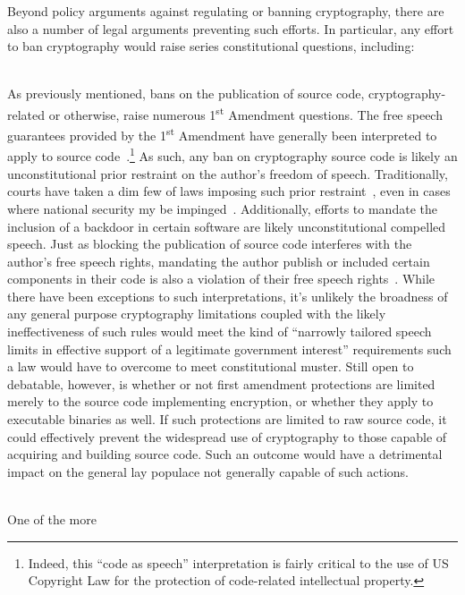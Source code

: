 Beyond policy arguments against regulating or banning cryptography, there
are also a number of legal arguments preventing such efforts. In
particular, any effort to ban cryptography would raise series
constitutional questions, including:

\begin{packed_desc}
\item[1\textsuperscript{st} Amendment] \hfill \\ As previously
  mentioned, bans on the publication of source code,
  cryptography-related or otherwise, raise numerous
  1\textsuperscript{st} Amendment questions. The free speech
  guarantees provided by the 1\textsuperscript{st} Amendment have
  generally been interpreted to apply to source
  code~\cite{ninthcir-bernstein, sixthcir-junger}.\footnote{Indeed,
    this ``code as speech'' interpretation is fairly critical to the
    use of US Copyright Law for the protection of code-related
    intellectual property.} As such, any ban on cryptography source
  code is likely an unconstitutional prior restraint on the author's
  freedom of speech. Traditionally, courts have taken a dim few of
  laws imposing such prior restraint~\cite{scotus-nearvminnesota},
  even in cases where national security my be
  impinged~\cite{scotus-nytvus}. Additionally, efforts to mandate the
  inclusion of a backdoor in certain software are likely
  unconstitutional compelled speech. Just as blocking the publication
  of source code interferes with the author's free speech rights,
  mandating the author publish or included certain components in their
  code is also a violation of their free speech
  rights~\cite{scotus-wooleyvmaynard}. While there have been
  exceptions to such interpretations, it's unlikely the broadness of
  any general purpose cryptography limitations coupled with the likely
  ineffectiveness of such rules would meet the kind of ``narrowly
  tailored speech limits in effective support of a legitimate
  government interest'' requirements such a law would have to overcome
  to meet constitutional muster. Still open to debatable, however, is
  whether or not first amendment protections are limited merely to the
  source code implementing encryption, or whether they apply to
  executable binaries as well. If such protections are limited to raw
  source code, it could effectively prevent the widespread use of
  cryptography to those capable of acquiring and building source
  code. Such an outcome would have a detrimental impact on the general
  lay populace not generally capable of such actions.
\item[2\textsuperscript{nd} Amendment] \hfill \\ One of the more

\end{packed_desc}
